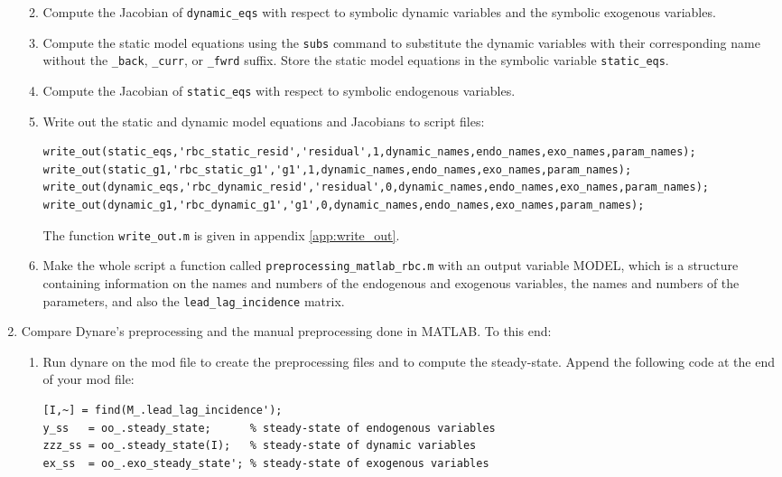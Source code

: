 \begin{enumerate}
\begin{enumerate}
\begin{itemize}
 		\end{itemize}
	\item Compute the Jacobian of \texttt{dynamic\_eqs} with respect to symbolic dynamic variables and the symbolic exogenous variables.
	\item Compute the static model equations using the \texttt{subs} command
	  to substitute the dynamic variables with their corresponding name without the \texttt{\_back}, \texttt{\_curr}, or \texttt{\_fwrd} suffix.
	Store the static model equations in the symbolic variable \texttt{static\_eqs}.
	\item Compute the Jacobian of \texttt{static\_eqs} with respect to symbolic endogenous variables.    
    \item Write out the static and dynamic model equations and Jacobians to script files:
\begin{lstlisting}[style=Matlab-editor,basicstyle=\mlttfamily\scriptsize]
write_out(static_eqs,'rbc_static_resid','residual',1,dynamic_names,endo_names,exo_names,param_names);
write_out(static_g1,'rbc_static_g1','g1',1,dynamic_names,endo_names,exo_names,param_names);
write_out(dynamic_eqs,'rbc_dynamic_resid','residual',0,dynamic_names,endo_names,exo_names,param_names);
write_out(dynamic_g1,'rbc_dynamic_g1','g1',0,dynamic_names,endo_names,exo_names,param_names);
\end{lstlisting}
	The function \texttt{write\_out.m} is given in appendix \ref{app:write_out}.
	\item Make the whole script a function called \texttt{preprocessing\_matlab\_rbc.m} with an output variable MODEL,
	  which is a structure containing information on the names and numbers of the endogenous and exogenous variables,
  	  the names and numbers of the parameters, and also the \texttt{lead\_lag\_incidence} matrix.
	\end{enumerate}
\item Compare Dynare's preprocessing and the manual preprocessing done in MATLAB. To this end:
	\begin{enumerate}
	\item Run dynare on the mod file to create the preprocessing files and to compute the steady-state.
	Append the following code at the end of your mod file:
\begin{lstlisting}[style=Matlab-editor,basicstyle=\mlttfamily\scriptsize]
% create steady-state vectors
[I,~] = find(M_.lead_lag_incidence');
y_ss   = oo_.steady_state;      % steady-state of endogenous variables
zzz_ss = oo_.steady_state(I);   % steady-state of dynamic variables
ex_ss  = oo_.exo_steady_state'; % steady-state of exogenous variables


\end{lstlisting}
\end{enumerate}
\end{enumerate}
